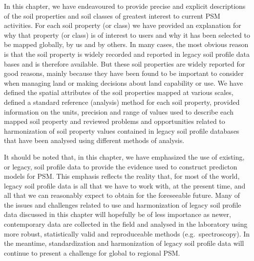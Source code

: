 \documentclass[graybox,natbib,nospthms,UStrade]{svmono}
\begin{document}
In this chapter, we have endeavoured to provide precise and explicit
descriptions of the soil properties and soil classes of greatest interest to current PSM activities.
For each soil property (or class) we have provided an explanation for
why that property (or class) is of interest to users and why it has been
selected to be mapped globally, by us and by others. In many cases, the most
obvious reason is that the soil property is widely recorded and reported
in legacy soil profile data bases and is therefore available. But these
soil properties are widely reported for good reasons, mainly because
they have been found to be important to consider when managing land or
making decisions about land capability or use. We have defined the
spatial attributes of the soil properties mapped at various scales,
defined a standard reference (analysis) method for each soil property,
provided information on the units, precision and range of values used to
describe each mapped soil property and reviewed problems and
opportunities related to harmonization of soil property values contained
in legacy soil profile databases that have been analysed using different
methods of analysis.

It should be noted that, in this chapter, we have emphasized the use of
existing, or legacy, soil profile data to provide the evidence used to
construct predicton models for PSM. This emphasis reflects the reality
that, for most of the world, legacy soil profile data is all that we
have to work with, at the present time, and all that we can reasonably
expect to obtain for the foreseeable future. Many of the issues and
challenges related to use and harmonization of legacy soil profile data
discussed in this chapter will hopefully be of less importance as newer,
contemporary data are collected in the field and analysed in the laboratory
using more robust, statistically valid and reproduceable methods (e.g.~spectroscopy).
In the meantime, standardization and harmonization of legacy soil profile
data will continue to present a challenge for global to regional PSM.
\end{document}
